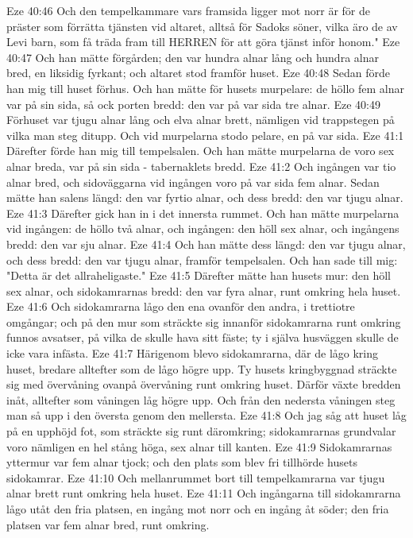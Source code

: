 Eze 40:46  Och den tempelkammare vars framsida ligger mot norr är för de präster som förrätta tjänsten vid altaret, alltså för Sadoks söner, vilka äro de av Levi barn, som få träda fram till HERREN för att göra tjänst inför honom."
Eze 40:47  Och han mätte förgården; den var hundra alnar lång och hundra alnar bred, en liksidig fyrkant; och altaret stod framför huset.
Eze 40:48  Sedan förde han mig till huset förhus. Och han mätte för husets murpelare: de höllo fem alnar var på sin sida, så ock porten bredd: den var på var sida tre alnar.
Eze 40:49  Förhuset var tjugu alnar lång och elva alnar brett, nämligen vid trappstegen på vilka man steg ditupp. Och vid murpelarna stodo pelare, en på var sida.
Eze 41:1  Därefter förde han mig till tempelsalen. Och han mätte murpelarna de voro sex alnar breda, var på sin sida - tabernaklets bredd.
Eze 41:2  Och ingången var tio alnar bred, och sidoväggarna vid ingången voro på var sida fem alnar. Sedan mätte han salens längd: den var fyrtio alnar, och dess bredd: den var tjugu alnar.
Eze 41:3  Därefter gick han in i det innersta rummet. Och han mätte murpelarna vid ingången: de höllo två alnar, och ingången: den höll sex alnar, och ingångens bredd: den var sju alnar.
Eze 41:4  Och han mätte dess längd: den var tjugu alnar, och dess bredd: den var tjugu alnar, framför tempelsalen. Och han sade till mig: "Detta är det allraheligaste."
Eze 41:5  Därefter mätte han husets mur: den höll sex alnar, och sidokamrarnas bredd: den var fyra alnar, runt omkring hela huset.
Eze 41:6  Och sidokamrarna lågo den ena ovanför den andra, i trettiotre omgångar; och på den mur som sträckte sig innanför sidokamrarna runt omkring funnos avsatser, på vilka de skulle hava sitt fäste; ty i själva husväggen skulle de icke vara infästa.
Eze 41:7  Härigenom blevo sidokamrarna, där de lågo kring huset, bredare alltefter som de lågo högre upp. Ty husets kringbyggnad sträckte sig med övervåning ovanpå övervåning runt omkring huset. Därför växte bredden inåt, alltefter som våningen låg högre upp. Och från den nedersta våningen steg man så upp i den översta genom den mellersta.
Eze 41:8  Och jag såg att huset låg på en upphöjd fot, som sträckte sig runt däromkring; sidokamrarnas grundvalar voro nämligen en hel stång höga, sex alnar till kanten.
Eze 41:9  Sidokamrarnas yttermur var fem alnar tjock; och den plats som blev fri tillhörde husets sidokamrar.
Eze 41:10  Och mellanrummet bort till tempelkamrarna var tjugu alnar brett runt omkring hela huset.
Eze 41:11  Och ingångarna till sidokamrarna lågo utåt den fria platsen, en ingång mot norr och en ingång åt söder; den fria platsen var fem alnar bred, runt omkring.
